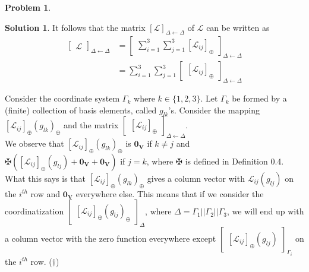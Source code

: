 \documentclass{article}
\theoremstyle{definition}
\newtheorem*{prob*}{Problem}
\newtheorem*{sln*}{Solution}
\newcommand{\V}{\mathbf{V}}
\newcommand{\lag}{\mathcal{L}}
\begin{document}
\begin{prob*}
\begin{sln*}
	It follows that the matrix $[\lag]_{\Delta\leftarrow\Delta}$ of $\lag$ can be written as
	\begin{align*}
	\begin{bmatrix}
	\lag
	\end{bmatrix}_{\Delta\leftarrow\Delta}
	&=
	\begin{bmatrix}
	\sum^3_{i=1}\sum^3_{j=1}[\lag_{ij}]_\oplus
	\end{bmatrix}_{\Delta\leftarrow\Delta}\\
	&=
	\sum^3_{i=1}\sum^3_{j=1}\begin{bmatrix}
	[\lag_{ij}]_\oplus
	\end{bmatrix}_{\Delta\leftarrow\Delta}
	\end{align*}
	
	Consider the coordinate system $\Gamma_k$ where $k\in \{1,2,3\}$. Let $\Gamma_k$ be formed by a (finite) collection of basis elements, called $g_{lk}$'s. Consider the mapping $[\lag_{ij}]_\oplus(g_{lk})_\oplus$ and the matrix $\begin{bmatrix}[\lag_{ij}]_\oplus\end{bmatrix}_{\Delta\leftarrow\Delta}$. \\
	
	We observe that $[\lag_{ij}]_\oplus(g_{lk})_\oplus$ is $\mathbf{0}_\V$ if $k\neq j$ and $\maltese\left([\lag_{ij}]_\oplus(g_{lj}) + \mathbf{0}_\V + \mathbf{0}_\V \right)$ if $j=k$, where $\maltese$ is defined in Definition 0.4. What this says is that $[\lag_{ij}]_\oplus(g_{lk})_\oplus$ gives a column vector with $\lag_{ij}(g_{lj})$ on the $i^{th}$ row and $\mathbf{0}_\V$ everywhere else. This means that if we consider the coordinatization $\begin{bmatrix}
	[\lag_{ij}]_\oplus(g_{lj})_\oplus
	\end{bmatrix}_\Delta$, where $\Delta = \Gamma_1||\Gamma_2||\Gamma_3$, we will end up with a column vector with the zero function everywhere except $\begin{bmatrix}[\lag_{ij}]_\oplus(g_{lj})\end{bmatrix}_{\Gamma_i}$ on the $i^{th}$ row. ($\dagger$) \\
	

\end{sln*}
\end{prob*}
\end{document}
